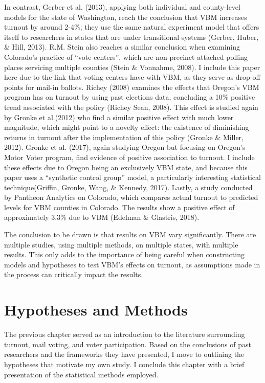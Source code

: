 \documentclass[12pt,twoside]{reedthesis}
\begin{document}
  In contrast, Gerber et al. (2013), applying both individual and
  county-level models for the state of Washington, reach the conclusion
  that VBM increases turnout by around 2-4\%; they use the same natural
  experiment model that offers itself to researchers in states that are
  under transitional systems (Gerber, Huber, \& Hill, 2013). R.M. Stein
  also reaches a similar conclusion when examining Colorado's practice of
  ``vote centers'', which are non-precinct attached polling places
  servicing multiple counties (Stein \& Vonnahme, 2008). I include this
  paper here due to the link that voting centers have with VBM, as they
  serve as drop-off points for mail-in ballots. Richey (2008) examines the
  effects that Oregon's VBM program has on turnout by using past elections
  data, concluding a 10\% positive trend associated with the policy
  (Richey Sean, 2008). This effect is studied again by Gronke et al.(2012)
  who find a similar positive effect with much lower magnitude, which
  might point to a novelty effect: the existence of diminishing returns in
  turnout after the implementation of this policy (Gronke \& Miller,
  2012). Gronke et al. (2017), again studying Oregon but focusing on
  Oregon's Motor Voter program, find evidence of positive association to
  turnout. I include these effects due to Oregon being an exclusively VBM
  state, and because this paper uses a ``synthetic control group'' model,
  a particularly interesting statistical technique(Griffin, Gronke, Wang,
  \& Kennedy, 2017). Lastly, a study conducted by Pantheon Analytics on
  Colorado, which compares actual turnout to predicted levels for VBM
  counties in Colorado. The results show a positive effect of
  approximately 3.3\% due to VBM (Edelman \& Glastris, 2018).
  
  The conclusion to be drawn is that results on VBM vary significantly.
  There are multiple studies, using multiple methods, on multiple states,
  with multiple results. This only adds to the importance of being careful
  when constructing models and hypotheses to test VBM's effects on
  turnout, as assumptions made in the process can critically impact the
  results.
  
  \chapter{Hypotheses and Methods}\label{hypotheses-and-methods}
  
  The previous chapter served as an introduction to the literature
  surrounding turnout, mail voting, and voter participation. Based on the
  conclusions of past researchers and the frameworks they have presented,
  I move to outlining the hypotheses that motivate my own study. I
  conclude this chapter with a brief presentation of the statistical
  methods employed.
  
\end{document}
